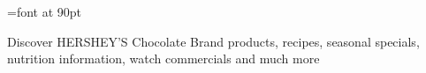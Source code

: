 \documentclass[a4paper]{report}
\begin{document}
\pagestyle{empty}

\font\big=font at 90pt     %
\big  
\begin{flushleft}
\noindent



Discover HERSHEY'S Chocolate Brand products, recipes, seasonal specials, nutrition information, watch commercials and much more


\end{flushleft}
\end{document}
